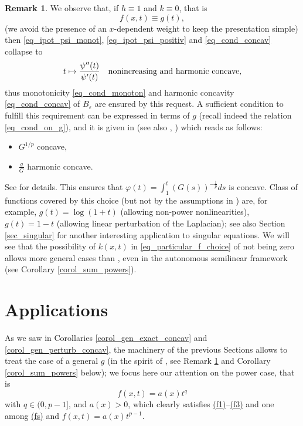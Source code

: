 \documentclass[11pt, reqno]{amsart}
\theoremstyle{definition}
\newtheorem{remark}[lemma]{Remark}
\numberwithin{equation}{section}
\def\eps{\varepsilon}
\begin{document}
\begin{remark}
\label{rem_BMS_assumptions}
We observe that, if $h \equiv 1$ and $k\equiv 0$, that is
$$f(x,t)\equiv g(t),$$
(we avoid the presence of an $x$-dependent weight to keep the presentation simple) then \eqref{eq_ipot_psi_monot}, \eqref{eq_ipot_psi_positiv} and \eqref{eq_cond_concav} collapse to
$$ t \mapsto \frac{\psi''(t)}{\psi'(t)} \quad \hbox{nonincreasing and harmonic concave},$$
thus monotonicity \eqref{eq_cond_monoton} and harmonic concavity \eqref{eq_cond_concav} of $B_{\eps}$ are ensured by this request.
A sufficient condition to fulfill this requirement can be expressed in terms of $g$ (recall indeed the relation \eqref{eq_cond_on_g}), and it is given in \cite{BMS22} (see also \cite[Theorem 4.4]{CaFr85}, \cite[Corollary 2]{Kaw85W}) which reads as follows:
\begin{itemize}
\item[(i)] $G^{1/p}$ concave,
\item[(ii)] $\frac{g}{G}$ harmonic concave. 
\end{itemize}
See \cite[Section 4.5]{BMS22} for details. This ensures that $\varphi(t) = \int_1^t (G(s))^{-\frac{1}{p}} ds$ is concave. 
Class of functions covered by this choice (but not by the assumptions in \cite{Ken85}) are, for example, $g(t)=\log(1+t)$ (allowing non-power nonlinearities), $g(t)=1-t$ (allowing linear perturbation of the Laplacian); see also Section \ref{sec_singular} for another interesting application to singular equations.
We will see that the possibility of $k(x,t)$ in \eqref{eq_particular_f_choice} of not being zero allows more general cases than \cite{BMS22}, even in the autonomous semilinear framework (see Corollary \ref{corol_sum_powers}).
\end{remark}

\section{Applications}
\label{sec_applic}


As we saw in Corollaries \ref{corol_gen_exact_concav} and \ref{corol_gen_perturb_concav}, the machinery of the previous Sections allows to treat the case of a general $g$ (in the spirit of \cite{BMS22, MRS24}, see Remark \ref{rem_BMS_assumptions} and Corollary \ref{corol_sum_powers} below); we focus here our attention on the power case, that is
$$f(x,t) = a(x) t^{q}$$
with $q \in (0,p-1]$, and $a(x) > 0$, which clearly satisfies \hyperlink{(f1)}{\rm{(f1)}}--\hyperlink{(f3)}{\rm{(f3)}} and one among \hyperlink{(fs)}{\rm{(fs)}} and $f(x,t) = a(x) t^{p-1}$. 
\end{document}
